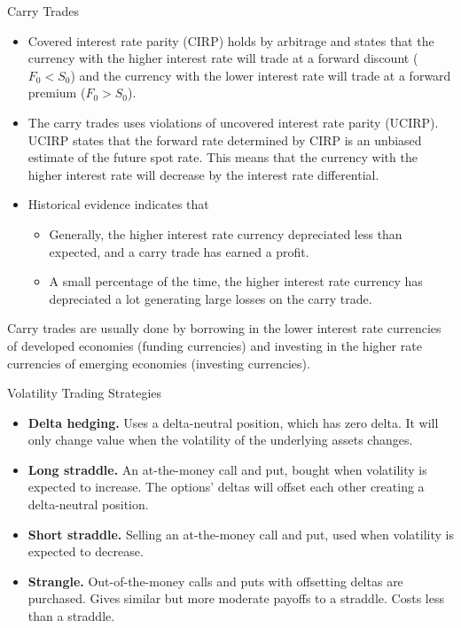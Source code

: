 \documentclass[../custom]{flashcards}
\newcommand{\studyArea}{Risk Management}
\begin{document}
\begin{flashcard}[\studyArea]{Carry Trades}
    \begin{flushleft}
        \begin{itemize}
            \item Covered interest rate parity (CIRP) holds by arbitrage and states that the currency with the higher interest rate will trade at a forward discount ($F_0 < S_0$) and the currency with the lower interest rate will trade at a forward premium ($F_0 > S_0$).
            \item The carry trades uses violations of uncovered interest rate parity (UCIRP). UCIRP states that the forward rate determined by CIRP is an unbiased estimate of the future spot rate. This means that the currency with the higher interest rate will decrease by the interest rate differential.
            \item Historical evidence indicates that
            \begin{itemize}
                \item Generally, the higher interest rate currency depreciated less than expected, and a carry trade has earned a profit.
                \item A small percentage of the time, the higher interest rate currency has depreciated a lot generating large losses on the carry trade.
            \end{itemize}
        \end{itemize}

        Carry trades are usually done by borrowing in the lower interest rate currencies of developed economies (funding currencies) and investing in the higher rate currencies of emerging economies (investing currencies).
    \end{flushleft}
\end{flashcard}

\begin{flashcard}[\studyArea]{Volatility Trading Strategies}
    \begin{itemize}
        \item \textbf{Delta hedging.} Uses a delta-neutral position, which has zero delta. It will only change value when the volatility of the underlying assets changes.
        \item \textbf{Long straddle.} An at-the-money call and put, bought when volatility is expected to increase. The options' deltas will offset each other creating a delta-neutral position.
        \item \textbf{Short straddle.} Selling an at-the-money call and put, used when volatility is expected to decrease.
        \item \textbf{Strangle.} Out-of-the-money calls and puts with offsetting deltas are purchased. Gives similar but more moderate payoffs to a straddle. Costs less than a straddle.
    \end{itemize}
\end{flashcard}
\end{document}
